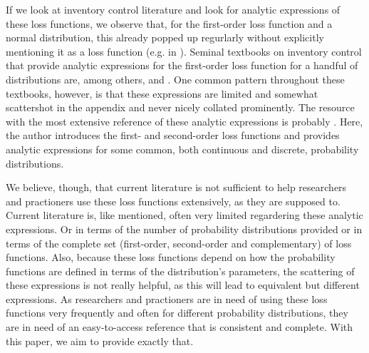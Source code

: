 \documentclass{article}
\begin{document}
\begin{flushleft}
    If we look at inventory control literature and look for analytic expressions of these loss functions, we observe that, for the first-order loss function and a normal distribution, this already popped up regurlarly without explicitly mentioning it as a loss function (e.g. in \cite{hadley1963analysis}).
    Seminal textbooks on inventory control that provide analytic expressions for the first-order loss function for a handful of distributions are, among others, \cite{silver1998inventory} and \cite{zipkin2000foundations}.
    One common pattern throughout these textbooks, however, is that these expressions are limited and somewhat scattershot in the appendix and never nicely collated prominently.
    The resource with the most extensive reference of these analytic expressions is probably \cite{zipkin2000foundations}.
    Here, the author introduces the first- and second-order loss functions and provides analytic expressions for some common, both continuous and discrete, probability distributions.
\end{flushleft}
\begin{flushleft}
    We believe, though, that current literature is not sufficient to help researchers and practioners use these loss functions extensively, as they are supposed to.
    Current literature is, like mentioned, often very limited regardering these analytic expressions. Or in terms of the number of probability distributions provided or in terms of the complete set (first-order, second-order and complementary) of loss functions.
    Also, because these loss functions depend on how the probability functions are defined in terms of the distribution's parameters, the scattering of these expressions is not really helpful, as this will lead to equivalent but different expressions.
    As researchers and practioners are in need of using these loss functions very frequently and often for different probability distributions, they are in need of an easy-to-access reference that is consistent and complete.
    With this paper, we aim to provide exactly that.
\end{flushleft}
\end{document}
